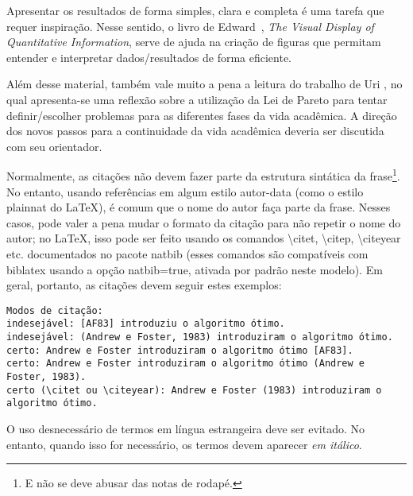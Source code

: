 Apresentar os resultados de forma simples, clara e completa é uma tarefa que
requer inspiração. Nesse sentido, o livro de Edward~\citet{tufte01:visualDisplay},
\emph{The Visual Display of Quantitative Information}, serve de ajuda na
criação de figuras que permitam entender e interpretar dados/resultados de forma
eficiente.

Além desse material, também vale muito a pena a leitura do trabalho de
Uri \citet{alon09:how}, no qual apresenta-se uma reflexão sobre a utilização
da Lei de Pareto para tentar definir/escolher problemas para as diferentes
fases da vida acadêmica. A direção dos novos passos para a continuidade da
vida acadêmica deveria ser discutida com seu orientador.

\label{sec:consideracoes_preliminares}

Normalmente, as citações não devem fazer parte da estrutura sintática da
frase\footnote{E não se deve abusar das notas de rodapé.}.
No entanto, usando referências em algum estilo autor-data (como o estilo
plainnat do \LaTeX{}), é comum que o nome do autor faça parte da frase. Nesses
casos, pode valer a pena mudar o formato da citação para não repetir o nome do
autor; no \LaTeX{}, isso pode ser feito usando os comandos
\textsf{\textbackslash{}citet}, \textsf{\textbackslash{}citep},
\textsf{\textbackslash{}citeyear} etc. documentados no pacote
natbib \citep{natbib} (esses comandos são compatíveis com biblatex
usando a opção \textsf{natbib=true}, ativada por padrão neste modelo). Em geral,
portanto, as citações devem seguir estes exemplos:

\footnotesize
\begin{verbatim}
Modos de citação:
indesejável: [AF83] introduziu o algoritmo ótimo.
indesejável: (Andrew e Foster, 1983) introduziram o algoritmo ótimo.
certo: Andrew e Foster introduziram o algoritmo ótimo [AF83].
certo: Andrew e Foster introduziram o algoritmo ótimo (Andrew e Foster, 1983).
certo (\citet ou \citeyear): Andrew e Foster (1983) introduziram o algoritmo ótimo.
\end{verbatim}
\normalsize

\enlargethispage{.5\baselineskip}

O uso desnecessário de termos em língua estrangeira deve ser evitado. No entanto,
quando isso for necessário, os termos devem aparecer \textit{em itálico}.

